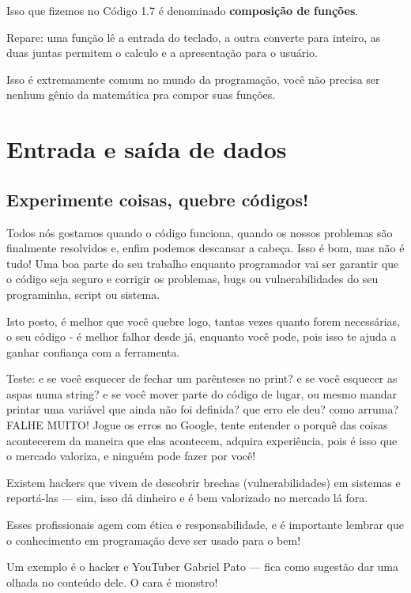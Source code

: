 \documentclass[12pt]{book}
\begin{document}
	\begin{tcolorbox}[colback=gray!10, colframe=black, title={\large\bfseries Observação}]
		Isso que fizemos no Código 1.7 é denominado \textbf{composição de funções}.
		
		Repare: uma função lê a entrada do teclado, a outra converte para inteiro, as duas juntas permitem o calculo e a apresentação para o usuário. \newline
		
		Isso é extremamente comum no mundo da programação, você não precisa ser nenhum gênio da matemática pra compor suas funções.
	\end{tcolorbox}
	
	\chapter{Entrada e saída de dados}
	
	\section{Experimente coisas, quebre códigos!}
	Todos nós gostamos quando o código funciona, quando os nossos problemas são finalmente resolvidos e, enfim podemos descansar a cabeça. Isso é bom, mas não é tudo! Uma boa parte do seu trabalho enquanto programador vai ser garantir que o código seja seguro e corrigir os problemas, bugs ou vulnerabilidades do seu programinha, script ou sistema.
	
	Isto posto, é melhor que você quebre logo, tantas vezes quanto forem necessárias, o seu código - é melhor falhar desde já, enquanto você pode, pois isso te ajuda a ganhar confiança com a ferramenta.
	
	Teste: e se você esquecer de fechar um parênteses no print? e se você esquecer as aspas numa string? e se você mover parte do código de lugar, ou mesmo mandar printar uma variável que ainda não foi definida? que erro ele deu? como arruma? FALHE MUITO! Jogue os erros no Google, tente entender o porquê das coisas acontecerem da maneira que elas acontecem, adquira experiência, pois é isso que o mercado valoriza, e ninguém pode fazer por você!
	
	\begin{tcolorbox}[colback=gray!10, colframe=black, title={\large\bfseries Curiosidade}]
		Existem hackers que vivem de descobrir brechas (vulnerabilidades) em sistemas e reportá-las — sim, isso dá dinheiro e é bem valorizado no mercado lá fora.
		
		Esses profissionais agem com ética e responsabilidade, e é importante lembrar que o conhecimento em programação deve ser usado para o bem! \newline
		
		Um exemplo é o hacker e YouTuber Gabriel Pato — fica como sugestão dar uma olhada no conteúdo dele. O cara é monstro!
	\end{tcolorbox}
	
\end{document}
